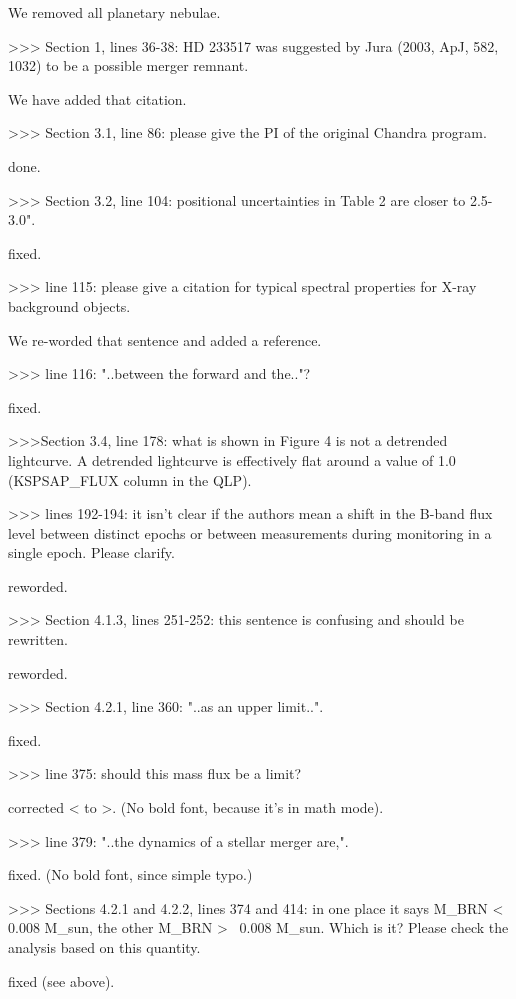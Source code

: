 We removed all planetary nebulae.

>>> Section 1, lines 36-38: HD 233517 was suggested by Jura (2003, ApJ, 582, 1032) to be a possible merger remnant.

We have added that citation.

>>> Section 3.1, line 86: please give the PI of the original Chandra program.

done.

>>> Section 3.2, line 104: positional uncertainties in Table 2 are closer to 2.5-3.0".

fixed.

>>> line 115: please give a citation for typical spectral properties for X-ray background objects.

We re-worded that sentence and added a reference.

>>> line 116: "..between the forward and the.."?

fixed.

>>>Section 3.4, line 178: what is shown in Figure 4 is not a detrended lightcurve. A detrended lightcurve is effectively flat around a value of 1.0 (KSPSAP_FLUX column in the QLP).

>>> lines 192-194: it isn't clear if the authors mean a shift in the B-band flux level between distinct epochs or between measurements during monitoring in a single epoch. Please clarify.

reworded.

>>> Section 4.1.3, lines 251-252: this sentence is confusing and should be rewritten.

reworded.

>>> Section 4.2.1, line 360: "..as an upper limit..".

fixed.

>>> line 375: should this mass flux be a limit?

corrected < to >. (No bold font, because it's in math mode).

>>> line 379: "..the dynamics of a stellar merger are,".

fixed. (No bold font, since simple typo.)

>>> Sections 4.2.1 and 4.2.2, lines 374 and 414: in one place it says M_BRN < 0.008 M_sun, the other M_BRN >~ 0.008 M_sun. Which is it? Please check the analysis based on this quantity.

fixed (see above).